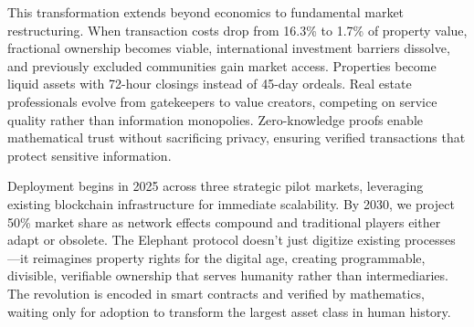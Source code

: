 This transformation extends beyond economics to fundamental market restructuring. When transaction costs drop from 16.3\% to 1.7\% of property value, fractional ownership becomes viable, international investment barriers dissolve, and previously excluded communities gain market access. Properties become liquid assets with 72-hour closings instead of 45-day ordeals. Real estate professionals evolve from gatekeepers to value creators, competing on service quality rather than information monopolies. Zero-knowledge proofs enable mathematical trust without sacrificing privacy, ensuring verified transactions that protect sensitive information.

Deployment begins in 2025 across three strategic pilot markets, leveraging existing blockchain infrastructure for immediate scalability. By 2030, we project 50\% market share as network effects compound and traditional players either adapt or obsolete. The Elephant protocol doesn't just digitize existing processes—it reimagines property rights for the digital age, creating programmable, divisible, verifiable ownership that serves humanity rather than intermediaries. The revolution is encoded in smart contracts and verified by mathematics, waiting only for adoption to transform the largest asset class in human history.
